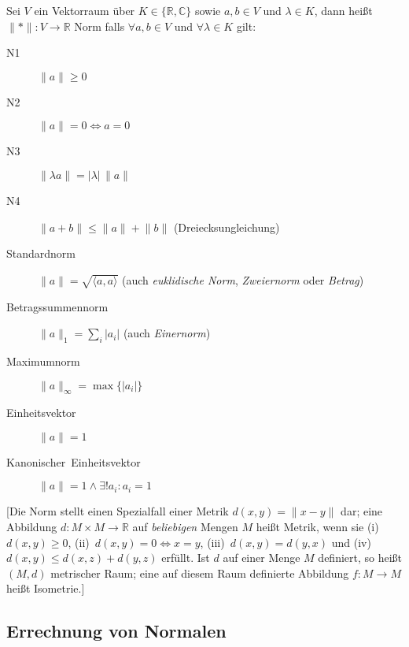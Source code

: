 Sei $V$ ein Vektorraum über $K \in \{\mathbb R, \mathbb C\}$ sowie $a,b \in V$ und $\lambda \in K$, dann heißt $\lVert*\rVert : V \to \mathbb R$ Norm falls $\forall a,b \in V$ und $\forall\lambda \in K$ gilt:
\begin{description}
  \item [{N1}]
	$\lVert a\rVert\geq0$
  \item [{N2}]
	$\lVert a\rVert=0 \iff a=0$
  \item [{N3}]
	$\lVert \lambda a \rVert  =  \lvert \lambda \rvert \, \lVert a \rVert$
  \item [{N4}]
	$\lVert a+b\rVert\leq\lVert a\rVert+\lVert b\rVert$ (Dreiecksungleichung)
  \item [{Standardnorm}] 
	$\lVert a\rVert=\sqrt{\langle a,a\rangle }$ (auch \emph{euklidische Norm}, \emph{Zweiernorm} oder \emph{Betrag})
  \item [{Betragssummennorm}] 
	$\lVert a\rVert_1=\sum_{i}\lvert a_i \rvert$ (auch \emph{Einernorm})
  \item [{Maximumnorm}] 
	$\lVert a\rVert_{\infty} = \max\bigl\{\lvert a_i \rvert \bigr\}$
  \item [{Einheitsvektor}] 
	$\lVert a\rVert=1$
  \item [{Kanonischer~Einheitsvektor}] 
	$\lVert a\rVert=1\land\exists! a_i : a_i=1$
\end{description}
\label{metrischer-raum}
[Die Norm stellt einen Spezialfall einer Metrik $d(x,y)=\lVert x-y \rVert$ dar; eine Abbildung $d : M \times M \to \mathbb R$ auf \emph{beliebigen} Mengen $M$ heißt Metrik, wenn sie (i)~$d(x,y)\geq0$, (ii)~$d(x,y)=0 \iff x=y$, (iii)~$d(x,y)=d(y,x)$ und (iv)~$d(x,y) \leq d(x,z)+d(y,z)$ erfüllt.
Ist $d$ auf einer Menge $M$ definiert, so heißt $(M,d)$ metrischer Raum; eine auf diesem Raum definierte Abbildung $f : M \to M$ heißt Isometrie.]

\subsection{\label{sub:Errechnung-von-Normalen}Errechnung von Normalen}

